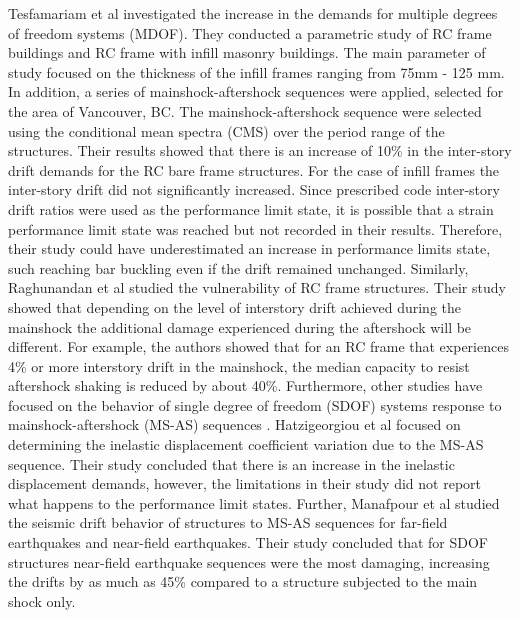 Tesfamariam et al \cite{Tesfamariam2015} investigated the increase in the demands for multiple degrees of freedom systems (MDOF). They conducted a parametric study of RC frame buildings and RC frame with infill masonry buildings. The main parameter of study focused on the thickness of the infill frames ranging from 75mm - 125 mm. In addition, a series of mainshock-aftershock sequences were applied, selected for the area of Vancouver, BC. The mainshock-aftershock sequence were selected using the conditional mean spectra (CMS) over the period range of the structures. Their results showed that there is an increase of 10\% in the inter-story drift demands for the RC bare frame structures. For the case of infill frames the inter-story drift did not significantly increased. Since prescribed code inter-story drift ratios were used as the performance limit state, it is possible that a strain performance limit state was reached but not recorded in their results. Therefore, their study could have underestimated an increase in performance limits state, such reaching bar buckling even if the drift remained unchanged. Similarly, Raghunandan et al \cite{Raghunandan2015} studied the vulnerability of RC frame structures. Their study showed that depending on the level of interstory drift achieved during the mainshock the additional damage experienced during the aftershock will be different. For example, the authors showed that for an RC frame that experiences 4\% or more interstory drift in the mainshock, the median capacity to resist aftershock shaking is reduced by about 40\%. Furthermore, other studies have focused on the behavior of single degree of freedom (SDOF) systems response to mainshock-aftershock (MS-AS) sequences \cite{Hatzigeorgiou2009}\cite{Manafpour2019}. Hatzigeorgiou et al focused on determining the inelastic displacement coefficient variation due to the MS-AS sequence. Their study concluded that there is an increase in the inelastic displacement demands, however, the limitations in their study did not report what happens to the performance limit states. Further, Manafpour et al studied the seismic drift behavior of structures to MS-AS sequences for far-field earthquakes and near-field earthquakes. Their study concluded that for SDOF structures near-field earthquake sequences were the most damaging, increasing the drifts by as much as 45\% compared to a structure subjected to the main shock only.

